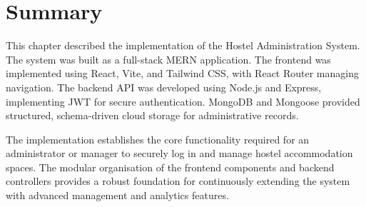 \section{Summary}

This chapter described the implementation of the Hostel Administration System. The system was built as a full-stack MERN application. The frontend was implemented using React, Vite, and Tailwind CSS, with React Router managing navigation. The backend API was developed using Node.js and Express, implementing JWT for secure authentication. MongoDB and Mongoose provided structured, schema-driven cloud storage for administrative records.

The implementation establishes the core functionality required for an administrator or manager to securely log in and manage hostel accommodation spaces. The modular organisation of the frontend components and backend controllers provides a robust foundation for continuously extending the system with advanced management and analytics features.
